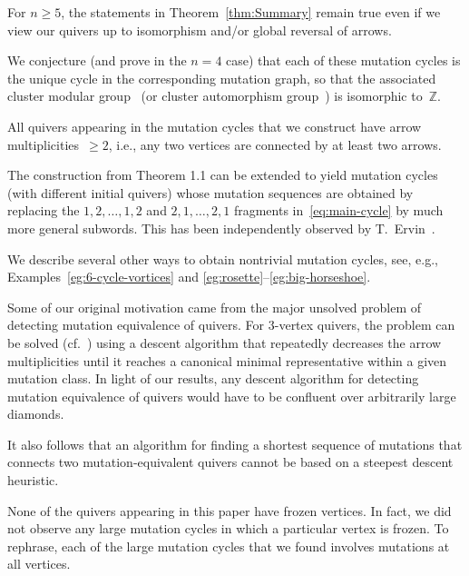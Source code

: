 \documentclass[11pt, letterpaper]{amsart}
\theoremstyle{definition}
\numberwithin{equation}{section}
\def\ZZ{{\mathbb Z}}
\begin{document}

For $n\ge 5$, the  statements in Theorem~\ref{thm:Summary} 
remain true even if we view our quivers up to isomorphism and/or global reversal of arrows. 

We conjecture (and prove in the $n=4$ case) that each of these mutation cycles is the unique cycle in the corresponding mutation graph, 
so that the associated cluster modular group~\cite{FG} 
(or cluster automorphism group~\cite{ASS}) is isomorphic to~$\ZZ$. 

All quivers appearing in the mutation cycles that we construct 
have arrow multiplicities~$\ge2$, i.e., any two vertices are connected by at least two arrows. 

\medskip

The construction from Theorem 1.1 can be extended to yield mutation cycles  (with different initial quivers)
whose mutation sequences are obtained by replacing the $1, 2, \dots, 1, 2$ and $2, 1, \dots, 2, 1$ fragments in~\eqref{eq:main-cycle} 
by much more general subwords. 
This has been independently observed by T.~Ervin~\cite{ervin}.

We describe several other ways to obtain nontrivial mutation cycles, see, e.g., 
Examples~\ref{eg:6-cycle-vortices} and \ref{eg:rosette}--\ref{eg:big-horseshoe}. 

\pagebreak[3]

Some of our original motivation came from the major unsolved problem of detecting mutation equivalence of quivers. 
For $3$-vertex quivers, the problem can be solved (cf.~\cite{ABBS}) using a descent algorithm that
repeatedly decreases the arrow multiplicities until it reaches a canonical minimal representative within a given mutation class.
In light of our results, any descent algorithm for detecting mutation equivalence of quivers 
would have to be confluent over arbitrarily large diamonds. 

It also follows that an algorithm for finding a shortest sequence of mutations
that connects two mutation-equivalent quivers cannot be based on a steepest descent heuristic.

\pagebreak[3]

None of the quivers appearing in this paper have frozen vertices.
In fact, we did not observe any large mutation cycles in which a particular vertex is frozen. 
To rephrase, each of the large mutation cycles that we found involves mutations at all vertices. 
\end{document}
